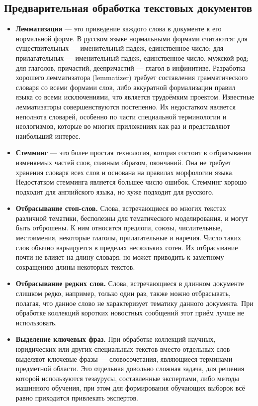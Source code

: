 \documentclass[article, 10pt]{disser}
\begin{document}
\subsection{Предварительная обработка текстовых документов}
\begin{itemize}
    \item \textbf{Лемматизация} --- это приведение каждого слова в документе к его нормальной форме. В русском языке нормальными формами считаются: для существительных — именительный падеж, единственное число; для прилагательных — именительный падеж, единственное число, мужской род; для глаголов, причастий, деепричастий --- глагол в инфинитиве. Разработка хорошего лемматизатора (lemmatizer) требует составления грамматического словаря со всеми формами слов, либо аккуратной формализации правил языка со всеми исключениями, что является трудоёмким проектом. Известные лемматизаторы совершенствуются постепенно. Их недостатком является неполнота словарей, особенно по части специальной терминологии и неологизмов, которые во многих приложениях как раз и представляют наибольший интерес.

\item \textbf{Стемминг} --- это более простая технология, которая состоит в отбрасывании изменяемых частей слов, главным образом, окончаний. Она не требует хранения словаря всех слов и основана на правилах морфологии языка. Недостатком стемминга является большее число ошибок. Стемминг хорошо подходит для английского языка, но хуже подходит для русского.

\item \textbf{Отбрасывание стоп-слов.} Слова, встречающиеся во многих текстах различной тематики, бесполезны для тематического моделирования, и могут быть отброшены. К ним относятся предлоги, союзы, числительные, местоимения, некоторые глаголы, прилагательные и наречия. Число таких слов обычно варьируется в пределах нескольких сотен. Их отбрасывание почти не влияет на длину словаря, но может приводить к заметному сокращению длины некоторых текстов.

\item \textbf{Отбрасывание редких слов.} Слова, встречающиеся в длинном документе слишком редко, например, только один раз, также можно отбрасывать, полагая, что данное слово не характеризует тематику данного документа. При обработке коллекций коротких новостных сообщений этот приём лучше не использовать.

\item \textbf{Выделение ключевых фраз.} При обработке коллекций научных, юридических или других специальных текстов вместо отдельных слов выделяют ключевые фразы --- словосочетания, являющиеся терминами предметной области. Это отдельная довольно сложная задача, для решения которой используются тезаурусы, составленные экспертами, либо методы машинного обучения, при этом для формирования обучающих выборок всё равно приходится привлекать экспертов.
\end{itemize}
\end{document}
